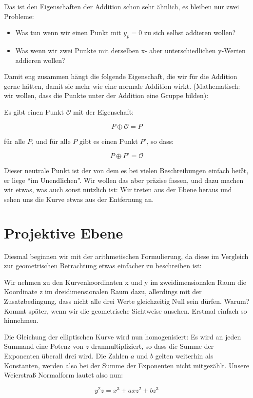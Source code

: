 \documentclass{article}
\newcounter{thm}
\begin{document}
Das ist den Eigenschaften der Addition schon sehr ähnlich, es bleiben nur zwei
Probleme:
\begin{itemize}
\item Was tun wenn wir einen Punkt mit $y_p = 0$ zu sich selbst addieren wollen?
\item Was wenn wir zwei Punkte mit derselben x- aber unterschiedlichen y-Werten
  addieren wollen?
\end{itemize}

Damit eng zusammen hängt die folgende Eigenschaft, die wir für die Addition
gerne hätten, damit sie mehr wie eine normale Addition wirkt. (Mathematisch:
wir wollen, dass die Punkte unter der Addition eine Gruppe bilden):

Es gibt einen Punkt $\mathcal{O}$ mit der Eigenschaft:

$$  P \oplus \mathcal{O} = P $$

für alle $P$, und für alle $P$ gibt es einen Punkt $P'$, so dass:

$$  P \oplus P' = \mathcal{O} $$

Dieser neutrale Punkt ist der von dem es bei vielen Beschreibungen einfach
heißt, er liege ``im Unendlichen''. Wir wollen das aber präzise fassen, und dazu
machen wir etwas, was auch sonst nützlich ist: Wir treten aus der Ebene heraus
und sehen uns die Kurve etwas aus der Entfernung an.

\section{Projektive Ebene}

Diesmal beginnen wir mit der arithmetischen Formulierung, da diese im
Vergleich zur geometrischen Betrachtung etwas einfacher zu beschreiben ist:

Wir nehmen zu den Kurvenkoordinaten x und y im zweidimensionalen Raum die
Koordinate z im dreidimensionalen Raum dazu, allerdings mit der
Zusatzbedingung, dass nicht alle drei Werte gleichzeitig Null sein dürfen.
Warum? Kommt später, wenn wir die geometrische Sichtweise ansehen. Erstmal
einfach so hinnehmen.

Die Gleichung der elliptischen Kurve wird nun homogenisiert: Es wird an jeden
Summand eine Potenz von $z$ dranmultipliziert, so dass die Summe der
Exponenten überall drei wird. Die Zahlen $a$ und $b$ gelten weiterhin als
Konstanten, werden also bei der Summe der Exponenten nicht mitgezählt. Unsere
Weierstraß Normalform lautet also nun:

$$ y^2z = x^3 + a xz^2 + b z^3 $$
\end{document}
